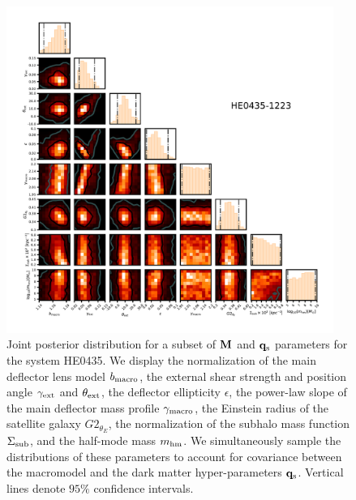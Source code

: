 \begin{figure}
	\includegraphics[clip,trim=1.5cm 1.6cm 1cm
	1cm,width=0.95\textwidth,keepaspectratio]{./figures_wdmchillsout/joint0435.pdf}
	\caption[Joint posterior distribution of model parameters for HE0435]{\label{fig:0435inf} Joint posterior distribution for a subset of ${\bf{M}}$ and ${\bf{q}_{\rm{s}}}$ parameters for the system HE0435. We display the normalization of the main deflector lens model $b_{\rm{macro}}$, the external shear strength and position angle $\gamma_{\rm{ext}}$ and $\theta_{\rm{ext}}$, the deflector ellipticity $\epsilon$, the power-law slope of the main deflector mass profile $\gamma_{\rm{macro}}$, the Einstein radius of the satellite galaxy $G2_{\theta_E}$, the normalization of the subhalo mass function $\Sigma_{\rm{sub}}$, and the half-mode mass ${m_{\rm{hm}}}$. We simultaneously sample the distributions of these parameters to account for covariance between the macromodel and the dark matter hyper-parameters ${\bf{q}_{\rm{s}}}$. Vertical lines denote $95\%$ confidence intervals.}
\end{figure}	
